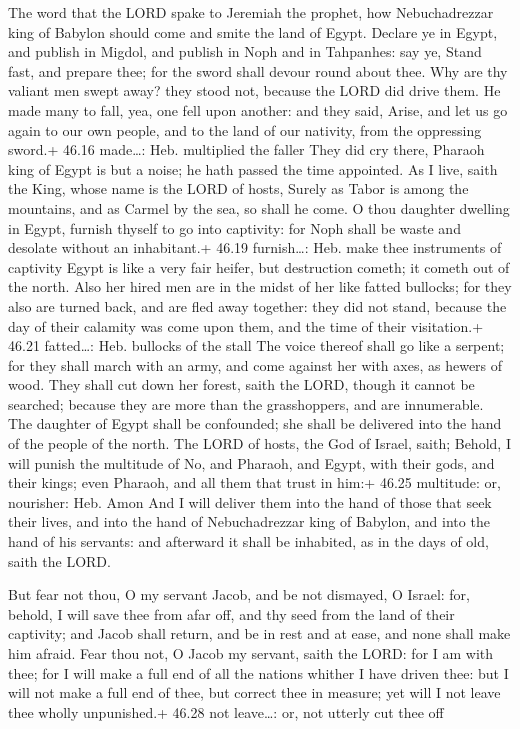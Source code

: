  The word that the LORD spake to Jeremiah the prophet,
how Nebuchadrezzar king of Babylon should come and smite the land of
Egypt.  Declare ye in Egypt, and publish in Migdol, and
publish in Noph and in Tahpanhes: say ye, Stand fast, and prepare thee;
for the sword shall devour round about thee.  Why are thy
valiant men swept away? they stood not, because the LORD did drive them.
 He made many to fall, yea, one fell upon another: and they
said, Arise, and let us go again to our own people, and to the land of
our nativity, from the oppressing sword.+ 46.16 made\ldots: Heb.
multiplied the faller  They did cry there, Pharaoh king of
Egypt is but a noise; he hath passed the time appointed. 
As I live, saith the King, whose name is the LORD of hosts, Surely as
Tabor is among the mountains, and as Carmel by the sea, so shall he
come.  O thou daughter dwelling in Egypt, furnish thyself
to go into captivity: for Noph shall be waste and desolate without an
inhabitant.+ 46.19 furnish\ldots: Heb. make thee instruments of
captivity  Egypt is like a very fair heifer, but
destruction cometh; it cometh out of the north.  Also her
hired men are in the midst of her like fatted bullocks; for they also
are turned back, and are fled away together: they did not stand, because
the day of their calamity was come upon them, and the time of their
visitation.+ 46.21 fatted\ldots: Heb. bullocks of the stall
 The voice thereof shall go like a serpent; for they shall
march with an army, and come against her with axes, as hewers of wood.
 They shall cut down her forest, saith the LORD, though it
cannot be searched; because they are more than the grasshoppers, and are
innumerable.  The daughter of Egypt shall be confounded;
she shall be delivered into the hand of the people of the north.
 The LORD of hosts, the God of Israel, saith; Behold, I
will punish the multitude of No, and Pharaoh, and Egypt, with their
gods, and their kings; even Pharaoh, and all them that trust in him:+
46.25 multitude: or, nourisher: Heb. Amon  And I will
deliver them into the hand of those that seek their lives, and into the
hand of Nebuchadrezzar king of Babylon, and into the hand of his
servants: and afterward it shall be inhabited, as in the days of old,
saith the LORD.

 But fear not thou, O my servant Jacob, and be not
dismayed, O Israel: for, behold, I will save thee from afar off, and thy
seed from the land of their captivity; and Jacob shall return, and be in
rest and at ease, and none shall make him afraid.  Fear
thou not, O Jacob my servant, saith the LORD: for I am with thee; for I
will make a full end of all the nations whither I have driven thee: but
I will not make a full end of thee, but correct thee in measure; yet
will I not leave thee wholly unpunished.+ 46.28 not leave\ldots: or, not
utterly cut thee off

